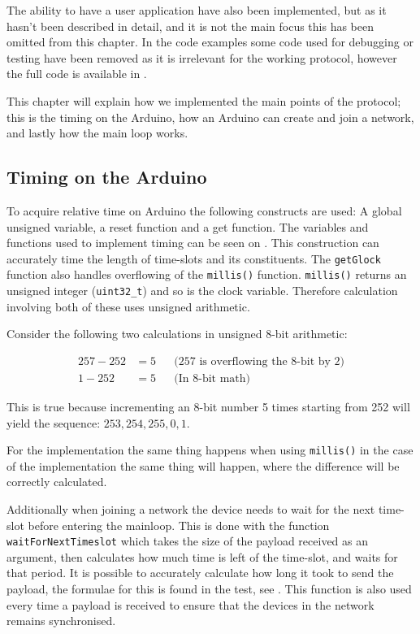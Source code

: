 \noindent
The ability to have a user application have also been implemented, but as it hasn't been described in detail, and it is not the main focus this has been omitted from this chapter.
In the code examples some code used for debugging or testing have been removed as it is irrelevant for the working protocol, however the full code is available in . 

This chapter will explain how we implemented the main points of the protocol; this is the timing on the Arduino, how an Arduino can create and join a network, and lastly how the main loop works. 

\subsection{Timing on the Arduino}
To acquire relative time on Arduino the following constructs are used: A global unsigned variable, a reset function and a get function.
The variables and functions used to implement timing can be seen on .
This construction can accurately time the length of time-slots and its constituents. 
The \texttt{getGlock} function also handles overflowing of the \texttt{millis()} function. 
\texttt{millis()} returns an unsigned integer (\texttt{uint32\_t}) and so is the clock variable.
Therefore calculation involving both of these uses unsigned arithmetic.

Consider the following two calculations in unsigned 8-bit arithmetic:

\begin{align*}
257 - 252   &= 5 && \text{(257 is overflowing the 8-bit by 2)} \\
1 - 252     &= 5 && \text{(In 8-bit math)}
\end{align*}

This is true because incrementing an 8-bit number 5 times starting from 252 will yield the sequence: $253, 254, 255, 0, 1$. 

For the implementation the same thing happens when using \texttt{millis()} in the case of the implementation the same thing will happen, where the difference will be correctly calculated.

Additionally when joining a network the device needs to wait for the next time-slot before entering the mainloop. 
This is done with the function \texttt{waitForNextTimeslot} which takes the size of the payload received as an argument, then calculates how much time is left of the time-slot, and waits for that period. 
It is possible to accurately calculate how long it took to send the payload, the formulae for this is found in the test, see .
This function is also used every time a payload is received to ensure that the devices in the network remains synchronised. 

